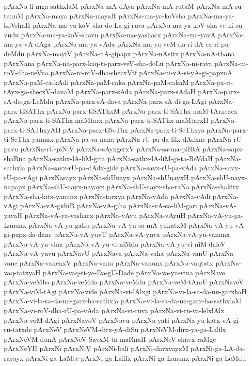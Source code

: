 {pArxNa-li-mga-sathxlaM
pArxNa-mA-dAya
pArxNa-mA-rutaM
pArxNa-mA-ru-tanuM
pArxNa-maya
pArxNa-mayaH
pArxNa-ma-ya-koVsha
pArxNa-ma-ya-koVshaH
pArxNa-ma-ya-koV-sha-do-La-gi-ruva
pArxNa-ma-ya-koV-sha-ve-ni-su-vudu
pArxNa-ma-ya-koV-shavu
pArxNa-ma-yashacx
pArxNa-ma-yavA
pArxNa-ma-ya-vA-dAga
pArxNa-ma-ya-vAda
pArxNa-ma-ya-veM-da-ri-dA-ca-ri-pu-deMdu
pArxNa-mayiV
pArxNa-nA-gipapx
pArxNa-nAsitx
pArxNa-nA-thana
pArxNana
pArxNa-na-parx-kaq-ti-parx-veV-sha-doLu
pArxNa-ni-rava
pArxNa-ni-roV-dha-neVna
pArxNa-ni-roV-dha-shecxVtf
pArxNa-ni-vA-si-yA-gi-papxnA
pArxNa-paM-ca-kAdi
pArxNa-paM-caka
pArxNa-paM-cakaM
pArxNa-pa-ri-tAyx-ga-shecxV-danaM
pArxNa-parx-sAda
pArxNa-parx-sAdaH
pArxNa-parx-sA-da-ga-LeMdu
pArxNa-parx-sA-dava
pArxNa-parx-sA-di-ga-LAgi
pArxNa-parx-tiSAThx
pArxNa-parx-tiSAThxM
pArxNa-parx-ti-SAThx-maM-tArxcacx
pArxNa-parx-ti-SAThx-maMtarx
pArxNa-parx-ti-SAThx-maMtarxH
pArxNa-parx-ti-SAThxyAH
pArxNa-parx-tiSeThx
pArxNa-parx-ti-SeThxya
pArxNa-parx-ti-SeThx-yanunx
pArxNa-pa-va-nana
pArxNa-rU-pa-da-lilx-dAdxne
pArxNa-rU-pavu
pArxNa-rU-piNiV
pArxNa-sAyxgerxV
pArxNa-sa-ma-piRtA
pArxNa-sapx-shaRna
pArxNa-sathx-lA-liM-gita
pArxNa-sathx-lA-liM-gi-ta-BeVdaH
pArxNa-sathxla
pArxNa-savx-rU-pa-dAdx-gide
pArxNa-savx-rU-pa-vAda
pArxNa-savx-rU-pa-vAgi
pArxNasayx
pArxNa-shUnayx
pArxNa-shUnayxH
pArxNa-shU-nayx-napapx
pArxNa-shU-nayx-nayayx
pArxNa-shU-nayx-sha-raNa
pArxNa-shakitx
pArxNa-sha-kitx-yanunx
pArxNa-tarxya
pArxNa-vAda
pArxNa-vAdi
pArxNa-vAgi
pArxNa-vA-giduR
pArxNa-vA-giha
pArxNa-vA-sa-liM-gari
pArxNa-vA-yavaH
pArxNa-vA-ya-vashacx
pArxNa-vAyu
pArxNa-vAyuH
pArxNa-vA-yu-ga-Lanunx
pArxNa-vA-yu-gaLu
pArxNa-vA-yu-sa-mA-yukatxM
pArxNa-vA-yu-vA-gi-pupx-da-dane
pArxNa-vA-yuvU
pArxNa-vA-yuva
pArxNa-vA-yu-vanunx
pArxNa-vA-yu-vina
pArxNa-vA-yu-vi-niMda
pArxNa-vA-yu-vi-niM-daleV
pArxNa-vA-yuvu
pArxNavU
pArxNava
pArxNa-vaha
pArxNa-vanU
pArxNa-vane
pArxNa-vanenxV
pArxNa-vanu
pArxNa-vanunx
pArxNa-vaqtatx
pArxNa-vaq-tatxyaH
pArxNa-vaq-ti-yo-Da-gU-Dade
pArxNa-va-yu-vina
pArxNave
pArxNa-veMba
pArxNa-veMda
pArxNa-veMdu
pArxNa-veM-tAmU
pArxNaveV
pArxNa-viM-tAgi
pArxNa-vide
pArxNa-vi-lAlxgi
pArxNa-vi-la-sa-da-nu-garxhaH
pArxNa-vi-la-sa-da-nu-garx-ha-sathxla
pArxNa-vi-la-sa-da-nu-garx-ha-sathxlaM
pArxNa-vi-roV-dha-rU-pa-vAda
pArxNa-vi-ruva
pArxNa-vi-ru-va-lelxlAlx
pArxNa-voM-dAgi
pArxNavoV
pArxNavu
pArxNa-yati
pArxNa-yu-katx-vA-gi-ru-tatxde
pArxNeV
pArxNeVM-dirx-yA-diSu
pArxNeVM-dirx-ya-ga-Lalilx
pArxNeVM-dunA
pArxNeV-SavxM-ta-maRnaH
pArxNeV-shavx-raMge
pArxNeYH
pArxNi
pArxNiV
pArxNi-bali
pArxNi-darxvayxM
pArxNi-ga-LA-da-rayayx
pArxNi-ga-LaMte
pArxNi-ga-Lalilx
pArxNi-ga-Lanunx
pArxNi-ga-LeMdu
}

